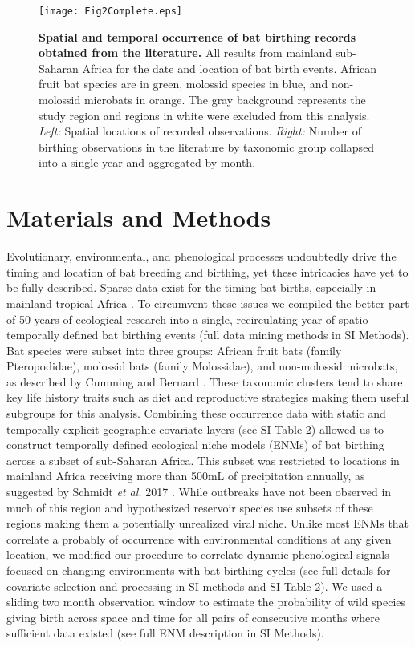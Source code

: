 \documentclass[a4paper,twoside, onecolumn]{article}
\begin{document}
	\begin{figure}[h!]
		\centering
		\texttt{[image: Fig2Complete.eps]}
		\caption{\textbf{Spatial and temporal occurrence of bat birthing records obtained from the literature.}
			All results from mainland sub-Saharan Africa for the date and location of bat birth events. African fruit bat species are in green, molossid species in blue, and non-molossid microbats in orange. The gray background represents the study region and regions in white were excluded from this analysis. \textit{Left:} Spatial locations of recorded observations. \textit{Right:} Number of birthing observations in the literature by taxonomic group collapsed into a single year and aggregated by month.}
		\label{fig:F2}
	\end{figure}
	\section*{Materials and Methods}
	Evolutionary, environmental, and phenological processes undoubtedly drive the timing and location of bat breeding and birthing, yet these intricacies have yet to be fully described. Sparse data exist for the timing bat births, especially in mainland tropical Africa \cite{Cumming1997,Monadjem2010}. To circumvent these issues we compiled the better part of 50 years of ecological research into a single, recirculating year of spatio-temporally defined bat birthing events (full data mining methods in SI Methods). Bat species were subset into three groups: African fruit bats (family Pteropodidae), molossid bats (family Molossidae), and non-molossid microbats, as described by Cumming and Bernard \cite{Cumming1997}. These taxonomic clusters tend to share key life history traits such as diet and reproductive strategies making them useful subgroups for this analysis. Combining these occurrence data with static and temporally explicit geographic covariate layers (see SI Table 2) allowed us to construct temporally defined ecological niche models (ENMs) of bat birthing across a subset of sub-Saharan Africa. This subset was restricted to locations in mainland Africa receiving more than 500mL of precipitation annually, as suggested by Schmidt \textit{et al.} 2017 \cite{Schmidt2017}. While outbreaks have not been observed in much of this region and hypothesized reservoir species use subsets of these regions making them a potentially unrealized viral niche. Unlike most ENMs that correlate a probably of occurrence with environmental conditions at any given location, we modified our procedure to correlate dynamic phenological signals focused on changing environments with bat birthing cycles (see full details for covariate selection and processing in SI methods and SI Table 2). We used a sliding two month observation window to estimate the probability of wild species giving birth across space and time for all pairs of consecutive months where sufficient data existed (see full ENM description in SI Methods).\par
\end{document}

